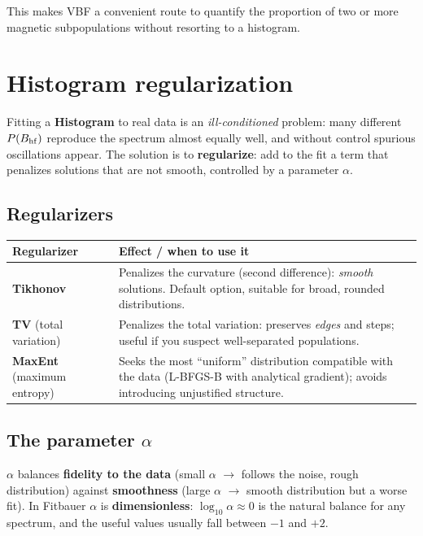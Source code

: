 This makes VBF a convenient route to quantify the proportion of two or more magnetic
subpopulations without resorting to a histogram.

\section{Histogram regularization}
\label{sec:regularizacion}

Fitting a \textbf{Histogram} to real data is an \emph{ill-conditioned} problem: many
different $P(B_{\mathrm{hf}})$ reproduce the spectrum almost equally well, and without control
spurious oscillations appear. The solution is to \textbf{regularize}: add to the fit
a term that penalizes solutions that are not smooth, controlled by a parameter
$\alpha$.

\subsection{Regularizers}

\begin{center}
\begin{tabular}{@{}lp{}@{}}
\toprule
\textbf{Regularizer} & \textbf{Effect / when to use it} \\
\midrule
\textbf{Tikhonov} & Penalizes the curvature (second difference): \emph{smooth}
solutions. Default option, suitable for broad, rounded distributions. \\[4pt]
\textbf{TV} (total variation) & Penalizes the total variation: preserves
\emph{edges} and steps; useful if you suspect well-separated populations. \\[4pt]
\textbf{MaxEnt} (maximum entropy) & Seeks the most ``uniform'' distribution
compatible with the data (L-BFGS-B with analytical gradient); avoids introducing
unjustified structure. \\
\bottomrule
\end{tabular}
\end{center}

\subsection{The parameter $\alpha$}

$\alpha$ balances \textbf{fidelity to the data} (small $\alpha$ $\to$ follows the
noise, rough distribution) against \textbf{smoothness} (large $\alpha$ $\to$ smooth
distribution but a worse fit). In Fitbauer $\alpha$ is \textbf{dimensionless}:
$\log_{10}\alpha \approx 0$ is the natural balance for any spectrum, and the useful
values usually fall between $-1$ and $+2$.

